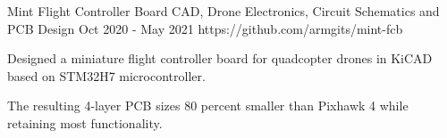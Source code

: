 \begin{project}
  {Mint Flight Controller Board}
  {CAD, Drone Electronics, Circuit Schematics and PCB Design}
  {Oct 2020 - May 2021}
  {https://github.com/armgits/mint-fcb}

  \item Designed a miniature flight controller board for quadcopter drones
        in KiCAD based on STM32H7 microcontroller.

  \item The resulting 4-layer PCB sizes 80 percent smaller than Pixhawk 4
        while retaining most functionality.

\end{project}

